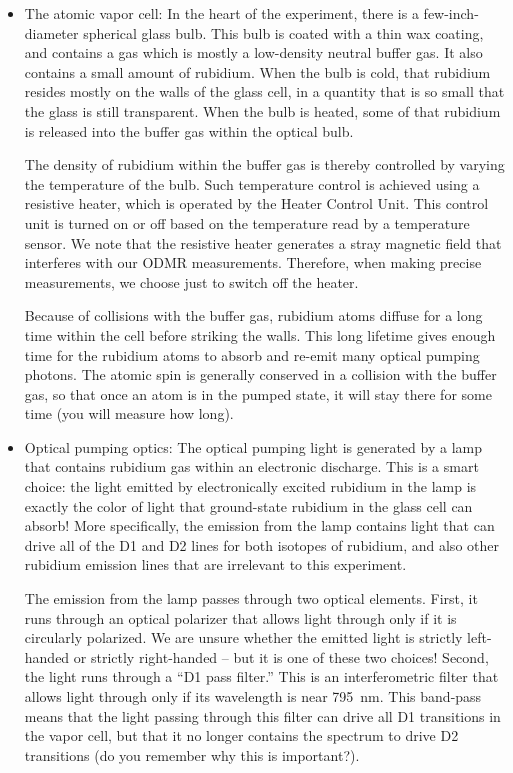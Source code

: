 \documentclass{../lab}
\begin{document}
\begin{itemize}
    \item{} The atomic vapor cell:  In the heart of the experiment, there is a few-inch-diameter spherical glass bulb.  This bulb is coated with a thin wax coating, and contains a gas which is mostly a low-density neutral buffer gas.  It also contains a small amount of rubidium.  When the bulb is cold, that rubidium resides mostly on the walls of the glass cell, in a quantity that is so small that the glass is still transparent.  When the bulb is heated, some of that rubidium is released into the buffer gas within the optical bulb.
    
    The density of rubidium within the buffer gas is thereby controlled by varying the temperature of the bulb.  Such temperature control is achieved using a resistive heater, which is operated by the Heater Control Unit.  This control unit is turned on or off based on the temperature read by a temperature sensor.   We note that the resistive heater generates a stray magnetic field that interferes with our ODMR measurements. Therefore, when making precise measurements, we choose just to switch off the heater.
    
    Because of collisions with the buffer gas, rubidium atoms diffuse for a long time within the cell before striking the walls.  This long lifetime gives enough time for the rubidium atoms to absorb and re-emit many optical pumping photons.  The atomic spin is generally conserved in a collision with the buffer gas, so that once an atom is in the pumped state, it will stay there for some time (you will measure how long).
    
    \item{} Optical pumping optics: The optical pumping light is generated by a lamp that contains rubidium gas within an electronic discharge.  This is a smart choice: the light emitted by electronically excited rubidium in the lamp is exactly the color of light that ground-state rubidium in the glass cell can absorb!   More specifically, the emission from the lamp contains light that can drive all of the D1 and D2 lines for both isotopes of rubidium, and also other rubidium emission lines that are irrelevant to this experiment.
    
    The emission from the lamp passes through two optical elements.  First, it runs through an optical polarizer that allows light through only if it is circularly polarized.  We are unsure whether the emitted light is strictly left-handed or strictly right-handed -- but it is one of these two choices!  Second, the light runs through a ``D1 pass filter.''  This is an interferometric filter that allows light through only if its wavelength is near 795~nm.  This band-pass means that the light passing through this filter can drive all D1 transitions in the vapor cell, but that it no longer contains the spectrum to drive D2 transitions (do you remember why this is important?).
    

\end{itemize}
\end{document}
